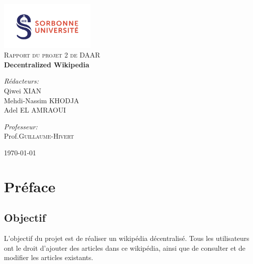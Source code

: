 \documentclass[14px]{article}
\begin{document}
	\setlength{\parindent}{0pt}
	\begin{titlepage}
		
		\begin{center}
			\includegraphics[width=0.35\textwidth]{logo.png}\\[1cm]
			
			\textsc{\Large Rapport du projet 2 de DAAR}\\[0.5cm]
			
			
			{ \huge \bfseries Decentralized Wikipedia}\\[0.4cm]
			
			\begin{minipage}{0.4\textwidth}
				\begin{flushleft} \large
					\emph{Rédacteurs:}\\
					Qiwei \textsc{XIAN}\\
					Mehdi-Nassim \textsc{KHODJA}\\
					Adel EL AMRAOUI
				\end{flushleft}
			\end{minipage}
			\begin{minipage}{0.4\textwidth}
				\begin{flushright} \large
					\emph{Professeur:} \\
					Prof.\textsc{Guillaume-Hivert}
				\end{flushright}
			\end{minipage}
			
			\vfill
			{\large \today}
		\end{center}
		
	\end{titlepage}
	\clearpage
	
	\tableofcontents
	\thispagestyle{empty}
	\clearpage
	
	\pagestyle{fancy}
	\rhead{\thepage}
	\fancyfoot{}
	
	\section{Préface}
	\subsection{Objectif}
	L'objectif du projet est de réaliser un wikipédia décentralisé. Tous les utilisateurs ont le droit d'ajouter des articles dans ce wikipédia, ainsi que de consulter et de modifier les articles existants.
\end{document}
